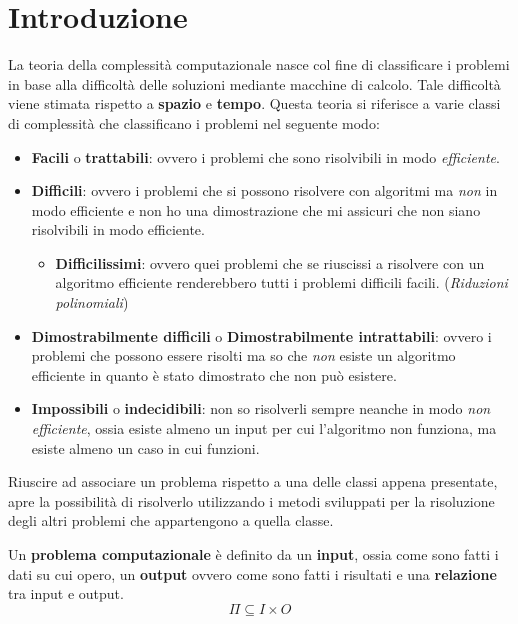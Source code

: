 \chapter{Introduzione}
La teoria della complessità computazionale nasce col fine di classificare i
problemi in base alla difficoltà delle soluzioni mediante macchine di calcolo.
Tale difficoltà viene stimata rispetto a \textbf{spazio} e \textbf{tempo}.
Questa teoria si riferisce a varie classi di complessità che classificano i
problemi nel seguente modo:
\begin{itemize}
    \item \textbf{Facili} o \textbf{trattabili}: ovvero i problemi che sono
          risolvibili in modo \textit{efficiente}.
    \item \textbf{Difficili}: ovvero i problemi che si possono risolvere con
          algoritmi ma \textit{non} in modo efficiente e non ho una dimostrazione
          che mi assicuri che non siano risolvibili in modo efficiente.
          \begin{itemize}
              \item \textbf{Difficilissimi}: ovvero quei problemi che se
                    riuscissi a risolvere con un algoritmo efficiente renderebbero
                    tutti i problemi difficili facili. (\textit{Riduzioni
                        polinomiali})
          \end{itemize}
    \item \textbf{Dimostrabilmente difficili} o \textbf{Dimostrabilmente
              intrattabili}: ovvero i problemi che possono essere risolti ma so
          che \textit{non} esiste un algoritmo efficiente in quanto è stato
          dimostrato che non può esistere.
    \item \textbf{Impossibili} o \textbf{indecidibili}: non so risolverli sempre
          neanche in modo \textit{non efficiente}, ossia esiste almeno un input
          per cui l'algoritmo non funziona, ma esiste almeno un caso in cui
          funzioni.
\end{itemize}
Riuscire ad associare un problema rispetto a una delle classi appena presentate,
apre la possibilità di risolverlo utilizzando i metodi sviluppati per la
risoluzione degli altri problemi che appartengono a quella classe.
\begin{definizione}
    Un \textbf{problema computazionale} è definito da un \textbf{input}, ossia
    come sono fatti i dati su cui opero, un \textbf{output} ovvero come sono
    fatti i risultati e una \textbf{relazione} tra input e output.
    \begin{equation}
        \Pi \subseteq I \times O
    \end{equation}
\end{definizione}
